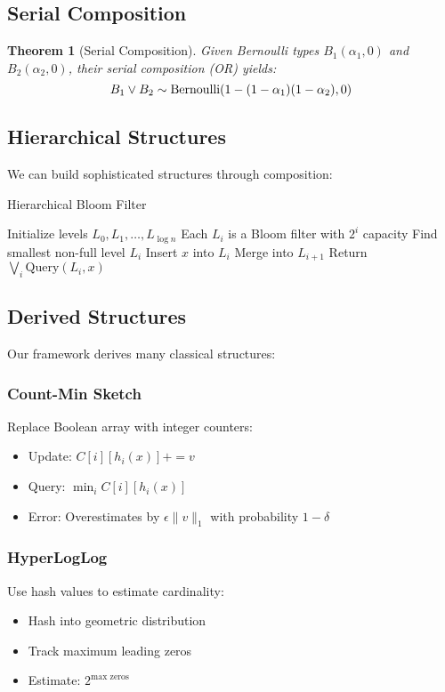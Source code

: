 \documentclass[11pt]{article}
\newtheorem{theorem}{Theorem}
\begin{document}
\subsection{Serial Composition}

\begin{theorem}[Serial Composition]
Given Bernoulli types $B_1(\alpha_1, 0)$ and $B_2(\alpha_2, 0)$, their serial composition (OR) yields:
$$B_1 \vee B_2 \sim \text{Bernoulli}(1-(1-\alpha_1)(1-\alpha_2), 0)$$
\end{theorem}

\subsection{Hierarchical Structures}

We can build sophisticated structures through composition:

\begin{algorithm}
\caption{Hierarchical Bloom Filter}
\begin{algorithmic}[1]
\STATE Initialize levels $L_0, L_1, \ldots, L_{\log n}$
\STATE Each $L_i$ is a Bloom filter with $2^i$ capacity
\STATE Find smallest non-full level $L_i$
\STATE Insert $x$ into $L_i$
\STATE Merge into $L_{i+1}$
\ENDIF
\ENDFOR
{}
\STATE Return $\bigvee_i \text{Query}(L_i, x)$
\ENDFOR
\end{algorithmic}
\end{algorithm}

\subsection{Derived Structures}

Our framework derives many classical structures:

\subsubsection{Count-Min Sketch}
Replace Boolean array with integer counters:
\begin{itemize}
\item Update: $C[i][h_i(x)] += v$
\item Query: $\min_i C[i][h_i(x)]$
\item Error: Overestimates by $\epsilon \|v\|_1$ with probability $1-\delta$
\end{itemize}

\subsubsection{HyperLogLog}
Use hash values to estimate cardinality:
\begin{itemize}
\item Hash into geometric distribution
\item Track maximum leading zeros
\item Estimate: $2^{\text{max zeros}}$
\end{itemize}
\end{document}
